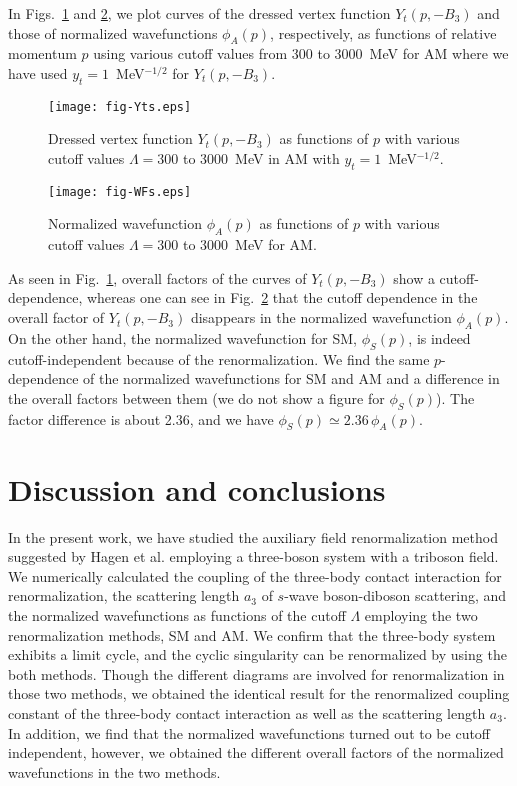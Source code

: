 \documentclass[jkps,preprint,fleqn,showpacs,showkeys]{revtex4}
\begin{document}
In Figs.~\ref{fig;Yts} and \ref{fig;WFs}, we plot
curves of the dressed vertex function $Y_t(p,-B_3)$ and
those of normalized wavefunctions $\phi_A(p)$, respectively,
as functions of relative momentum $p$ using various cutoff values
from 300 to 3000~MeV for AM where we have used
$y_t=1$~MeV$^{-1/2}$ for $Y_t(p,-B_3)$.
%
\begin{figure}[t]
\texttt{[image: fig-Yts.eps]}
\caption{
Dressed vertex function $Y_t(p,-B_3)$ as functions of $p$
with various cutoff values $\Lambda=300$ to 3000~MeV in AM
with $y_t = 1$~MeV$^{-1/2}$.
}
\label{fig;Yts}
\end{figure}
%
\begin{figure}[t]
\texttt{[image: fig-WFs.eps]}
\caption{
Normalized wavefunction $\phi_A(p)$ as functions of $p$
with various cutoff values $\Lambda=300$ to 3000~MeV for AM.
}
\label{fig;WFs}
\end{figure}
%
As seen in Fig.~\ref{fig;Yts}, overall factors
of the curves of $Y_t(p,-B_3)$ show a cutoff-dependence,
whereas one can see in Fig.~\ref{fig;WFs}
that the cutoff dependence in the overall factor of $Y_t(p,-B_3)$
disappears in the normalized wavefunction $\phi_A(p)$.
%
On the other hand, the normalized wavefunction for SM, $\phi_S(p)$,
is indeed cutoff-independent because of the renormalization. 
We find the same $p$-dependence of the normalized wavefunctions
for SM and AM and a difference in the overall factors between them
(we do not show a figure for $\phi_S(p)$).
%
The factor difference is about 2.36,
and we have $\phi_S(p) \simeq 2.36\, \phi_A(p)$.


\section{Discussion and conclusions}

In the present work, we have studied the auxiliary field renormalization method
suggested by Hagen et al. employing a three-boson system with
a triboson field.
% 
We numerically calculated
the coupling of the three-body contact interaction for renormalization,
the scattering length $a_3$ of $s$-wave boson-diboson scattering, and the
normalized wavefunctions as functions of the cutoff $\Lambda$
employing the two renormalization methods, SM and AM.
%
We confirm that the three-body system exhibits a limit cycle,
and the cyclic singularity can be renormalized by using the both methods.
%
Though the different diagrams are involved for renormalization
in those two methods, we obtained the identical result
for the renormalized coupling constant of the three-body contact interaction
as well as the scattering length $a_3$.
%
In addition, we find that the normalized wavefunctions turned out to be
cutoff independent, however, we obtained the different overall factors
of the normalized wavefunctions in the two methods.
\end{document}

